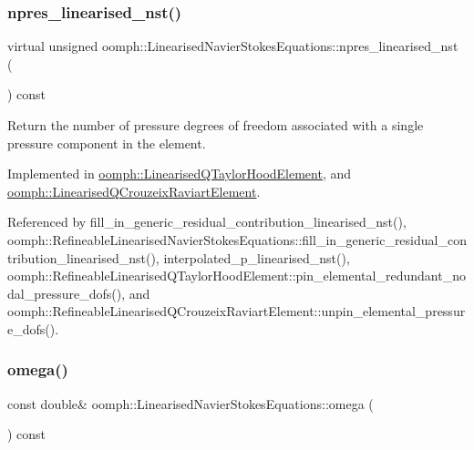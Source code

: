 \subsubsection{\texorpdfstring{npres\+\_\+linearised\+\_\+nst()}{npres\_linearised\_nst()}}
{\footnotesize\ttfamily virtual unsigned oomph\+::\+Linearised\+Navier\+Stokes\+Equations\+::npres\+\_\+linearised\+\_\+nst (\begin{DoxyParamCaption}{ }\end{DoxyParamCaption}) const\hspace{0.3cm}{\ttfamily [pure virtual]}}



Return the number of pressure degrees of freedom associated with a single pressure component in the element. 



Implemented in \hyperlink{classoomph_1_1LinearisedQTaylorHoodElement_a39fbc88bf3d2d013337c1a5009e0168f}{oomph\+::\+Linearised\+Q\+Taylor\+Hood\+Element}, and \hyperlink{classoomph_1_1LinearisedQCrouzeixRaviartElement_abf9a73af7823990fc95fd6bea9ecaca4}{oomph\+::\+Linearised\+Q\+Crouzeix\+Raviart\+Element}.



Referenced by fill\+\_\+in\+\_\+generic\+\_\+residual\+\_\+contribution\+\_\+linearised\+\_\+nst(), oomph\+::\+Refineable\+Linearised\+Navier\+Stokes\+Equations\+::fill\+\_\+in\+\_\+generic\+\_\+residual\+\_\+contribution\+\_\+linearised\+\_\+nst(), interpolated\+\_\+p\+\_\+linearised\+\_\+nst(), oomph\+::\+Refineable\+Linearised\+Q\+Taylor\+Hood\+Element\+::pin\+\_\+elemental\+\_\+redundant\+\_\+nodal\+\_\+pressure\+\_\+dofs(), and oomph\+::\+Refineable\+Linearised\+Q\+Crouzeix\+Raviart\+Element\+::unpin\+\_\+elemental\+\_\+pressure\+\_\+dofs().

\mbox{\label{classoomph_1_1LinearisedNavierStokesEquations_ae00c6162cce709644cdd1c8ab9a94ed1}} 
\subsubsection{\texorpdfstring{omega()}{omega()}}
{\footnotesize\ttfamily const double\& oomph\+::\+Linearised\+Navier\+Stokes\+Equations\+::omega (\begin{DoxyParamCaption}{ }\end{DoxyParamCaption}) const\hspace{0.3cm}{\ttfamily [inline]}}



